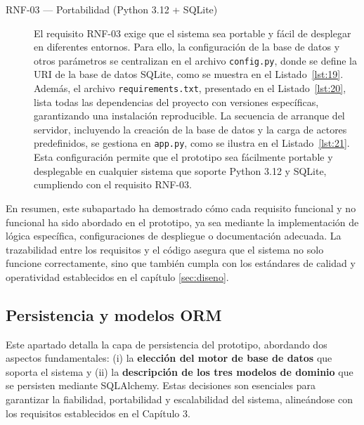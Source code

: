 \begin{description}
\item[RNF-03 — Portabilidad (Python 3.12 + SQLite)]  
El requisito RNF-03 exige que el sistema sea portable y fácil de desplegar en diferentes entornos. Para ello, la configuración de la base de datos y otros parámetros se centralizan en el archivo \texttt{config.py}, donde se define la URI de la base de datos SQLite, como se muestra en el Listado~\ref{lst:19}. Además, el archivo \texttt{requirements.txt}, presentado en el Listado~\ref{lst:20}, lista todas las dependencias del proyecto con versiones específicas, garantizando una instalación reproducible. La secuencia de arranque del servidor, incluyendo la creación de la base de datos y la carga de actores predefinidos, se gestiona en \texttt{app.py}, como se ilustra en el Listado~\ref{lst:21}. Esta configuración permite que el prototipo sea fácilmente portable y desplegable en cualquier sistema que soporte Python 3.12 y SQLite, cumpliendo con el requisito RNF-03.


\end{description}

En resumen, este subapartado ha demostrado cómo cada requisito funcional y no funcional ha sido abordado en el prototipo, ya sea mediante la implementación de lógica específica, configuraciones de despliegue o documentación adecuada. La trazabilidad entre los requisitos y el código asegura que el sistema no solo funcione correctamente, sino que también cumpla con los estándares de calidad y operatividad establecidos en el capítulo \ref{sec:diseno}.




\subsection{Persistencia y modelos ORM}
\label{subsec:orm}

Este apartado detalla la capa de persistencia del prototipo, abordando dos aspectos fundamentales: (i) la \textbf{elección del motor de base de datos} que soporta el sistema y (ii) la \textbf{descripción de los tres modelos de dominio} que se persisten mediante SQLAlchemy. Estas decisiones son esenciales para garantizar la fiabilidad, portabilidad y escalabilidad del sistema, alineándose con los requisitos establecidos en el Capítulo 3.

